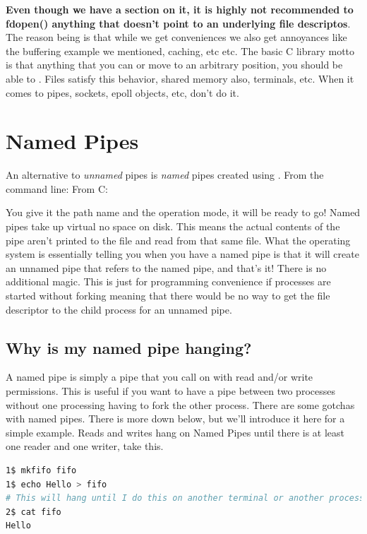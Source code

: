 \textbf{Even though we have a section on it, it is highly not recommended to fdopen() anything that doesn't point to an underlying file descriptos}.
The reason being is that while we get conveniences we also get annoyances like the buffering example we mentioned, caching, etc etc.
The basic C library motto is that anything that you can  or move to an arbitrary position, you should be able to .
Files satisfy this behavior, shared memory also, terminals, etc.
When it comes to pipes, sockets, epoll objects, etc, don't do it.

\section{Named Pipes}

An alternative to \emph{unnamed} pipes is \emph{named} pipes created using .
From the command line:  From C: 

You give it the path name and the operation mode, it will be ready to go!
Named pipes take up virtual no space on disk.
This means the actual contents of the pipe aren't printed to the file and read from that same file.
What the operating system is essentially telling you when you have a named pipe is that it will create an unnamed pipe that refers to the named pipe, and that's it!
There is no additional magic.
This is just for programming convenience if processes are started without forking meaning that there would be no way to get the file descriptor to the child process for an unnamed pipe.

\subsection{Why is my named pipe hanging?}

A named pipe  is simply a pipe that you call  on with read and/or write permissions.
This is useful if you want to have a pipe between two processes without one processing having to fork the other process.
There are some gotchas with named pipes.
There is more down below, but we'll introduce it here for a simple example.
Reads and writes hang on Named Pipes until there is at least one reader and one writer, take this.

\begin{lstlisting}[language=bash]
1$ mkfifo fifo
1$ echo Hello > fifo
# This will hang until I do this on another terminal or another process
2$ cat fifo
Hello
\end{lstlisting}

